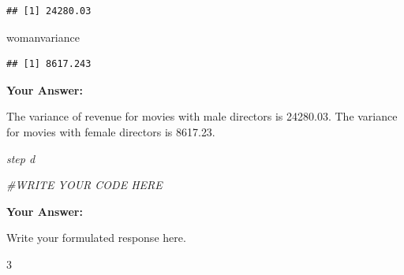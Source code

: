 \documentclass[
]{article}
\newenvironment{Shaded}{\begin{snugshade}}{\end{snugshade}}
\newcommand{\AttributeTok}[1]{\textcolor[rgb]{0.13,0.29,0.53}{#1}}
\newcommand{\CommentTok}[1]{\textcolor[rgb]{0.56,0.35,0.01}{\textit{#1}}}
\newcommand{\ConstantTok}[1]{\textcolor[rgb]{0.56,0.35,0.01}{#1}}
\newcommand{\DecValTok}[1]{\textcolor[rgb]{0.00,0.00,0.81}{#1}}
\newcommand{\FunctionTok}[1]{\textcolor[rgb]{0.13,0.29,0.53}{\textbf{#1}}}
\newcommand{\NormalTok}[1]{#1}
\newcommand{\OtherTok}[1]{\textcolor[rgb]{0.56,0.35,0.01}{#1}}
\newcommand{\SpecialCharTok}[1]{\textcolor[rgb]{0.81,0.36,0.00}{\textbf{#1}}}
\newcommand{\StringTok}[1]{\textcolor[rgb]{0.31,0.60,0.02}{#1}}
\begin{document}
\begin{Shaded}
\end{Shaded}

\begin{verbatim}
## [1] 24280.03
\end{verbatim}

\begin{Shaded}
\begin{Highlighting}[]
\NormalTok{womanvariance}
\end{Highlighting}
\end{Shaded}

\begin{verbatim}
## [1] 8617.243
\end{verbatim}

\textbf{Your Answer:}

The variance of revenue for movies with male directors is 24280.03. The
variance for movies with female directors is 8617.23.

\emph{step d}

\begin{Shaded}
\begin{Highlighting}[]
\CommentTok{\#WRITE YOUR CODE HERE}
\end{Highlighting}
\end{Shaded}

\textbf{Your Answer:}

Write your formulated response here.

3
\end{document}
